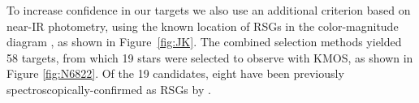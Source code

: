 \documentclass[manuscript]{aastex}
\begin{document}
To increase confidence in our targets we also use an additional criterion based on near-IR photometry, using the known location of RSGs in the color-magnitude diagram
\citep{Nikolaev00}, as shown in Figure~\ref{fig:JK}.
The combined selection methods yielded 58 targets, from which 19 stars were selected to observe with KMOS, as shown in Figure
\ref{fig:N6822}.
Of the 19 candidates, eight have been previously spectroscopically-confirmed as RSGs by
\cite{Levesque12}.





\end{document}
